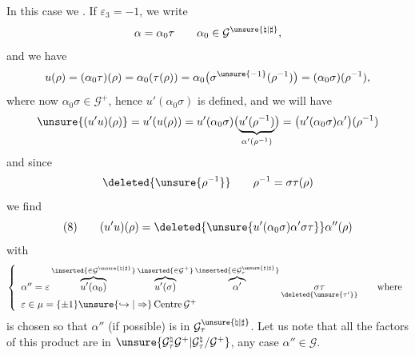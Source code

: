 In this case we . If $\varepsilon_3=-1$, we write
\[
\alpha=\alpha_0\tau\qquad
\alpha_0\in\mathcal{G}^{\unsure{\natural|\sharp}},
\]
and we have
\[
u(\rho)=(\alpha_0\tau)(\rho)=\alpha_0(\tau(\rho))
=\alpha_0\bigl(\sigma^{\unsure{-1}}(\rho^{-1})\bigr)
=(\alpha_0\sigma)(\rho^{-1}),
\]
where now $\alpha_0\sigma\in\mathcal{G}^{+}$, hence
$u'(\alpha_0\sigma)$ is defined, and we will have
\[
\unsure{(u'u)(\rho)}
=u'(u(\rho))
=u'(\alpha_0\sigma)
\bigl(\underbrace{u'(\rho^{-1})}_{\alpha'(\rho^{-1})}\bigr)
=\bigl(u'(\alpha_0\sigma)\alpha'\bigr)(\rho^{-1})
\]
and since
\[
\deleted{\unsure{\rho^{-1}}}\qquad
\rho^{-1}=\sigma\tau(\rho)
\]
we find
\[
(8)\qquad
(u'u)(\rho)=
\deleted{\unsure{u'(\alpha_0\sigma)\alpha'\sigma\tau}}
\alpha''(\rho)
\]
with
\[
\left\{
\begin{array}{l}
\alpha''=\varepsilon
\overbrace{u'(\alpha_0)}^{\inserted{\in\mathcal{G}^{\unsure{\natural|\sharp}}}}
\overbrace{u'(\sigma)}^{\inserted{\in\mathcal{G}^{+}}}
\overbrace{\alpha'}^{\inserted{\in\mathcal{G}^{\unsure{\natural|\sharp}}_\tau}}
\underset{\deleted{\unsure{\tau'}}}{\sigma\tau}
\qquad\text{where}\\
\varepsilon\in\mu=\{\pm1\}
\unsure{\hookrightarrow|\Rightarrow}\operatorname{Centre}\mathcal{G}^{+}
\end{array}
\right.
\]
 is chosen so that $\alpha''$ (if possible)
is in $\mathcal{G}^{\unsure{\natural|\sharp}}_\tau$.
Let us note that all the factors of this product are in
$\unsure{\mathcal{G}^{\natural}_\tau\mathcal{G}^{+}|
\mathcal{G}^{\natural}_\tau/\mathcal{G}^{+}}$,
 any case $\alpha''\in\mathcal{G}$.


